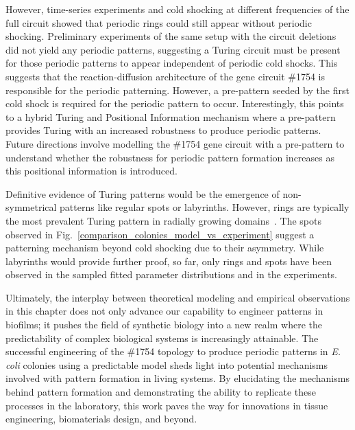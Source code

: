However, time-series experiments and cold shocking at different frequencies of the full circuit showed that periodic rings could still appear without periodic shocking.
Preliminary experiments of the same setup with the circuit deletions did not yield any periodic patterns, suggesting a Turing circuit must be present for those periodic patterns to appear independent of periodic cold shocks.
This suggests that the reaction-diffusion architecture of the gene circuit \#1754 is responsible for the periodic patterning.
However, a pre-pattern seeded by the first cold shock is required for the periodic pattern to occur.
Interestingly, this points to a hybrid Turing and Positional Information mechanism where a pre-pattern provides Turing with an increased robustness to produce periodic patterns.
Future directions involve modelling the \#1754 gene circuit with a pre-pattern to understand whether the robustness for periodic pattern formation increases as this positional information is introduced.

Definitive evidence of Turing patterns would be the emergence of non-symmetrical patterns like regular spots or labyrinths.
However, rings are typically the most prevalent Turing pattern in radially growing domains~\parencite{Konow2019}.
The spots observed in Fig.~\ref{comparison_colonies_model_vs_experiment} suggest a patterning mechanism beyond cold shocking due to their asymmetry.
While labyrinths would provide further proof, so far, only rings and spots have been observed in the sampled fitted parameter distributions and in the experiments.


Ultimately, the interplay between theoretical modeling and empirical observations in this chapter does not only advance our capability to engineer patterns in biofilms; it pushes the field of synthetic biology into a new realm where the predictability of complex biological systems is increasingly attainable.
The successful engineering of the \#1754 topology to produce periodic patterns in \textit{E. coli} colonies using a predictable model sheds light into potential mechanisms involved with pattern formation in living systems.
By elucidating the mechanisms behind pattern formation and demonstrating the ability to replicate these processes in the laboratory, this work paves the way for innovations in tissue engineering, biomaterials design, and beyond.